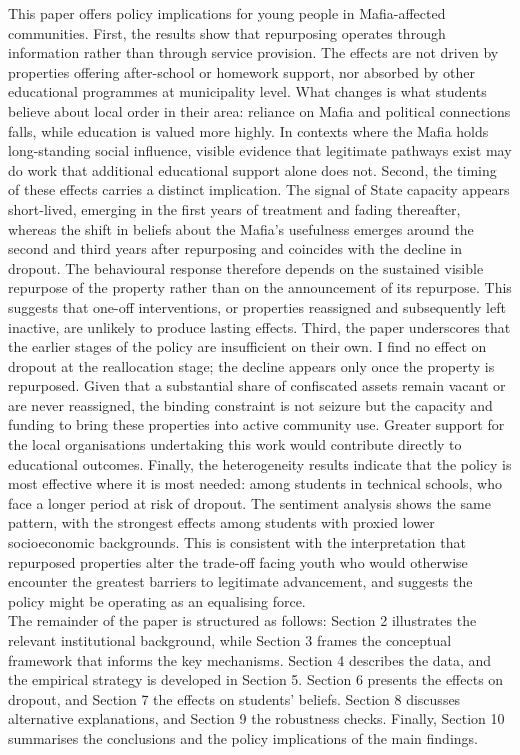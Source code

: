 \documentclass[12pt]{article}
\theoremstyle{plain}
\theoremstyle{plain}
\theoremstyle{plain}
\theoremstyle{definition}
\theoremstyle{plain}
\theoremstyle{definition}
\theoremstyle{plain}
\theoremstyle{remark}
\theoremstyle{definition}
\theoremstyle{definition}
\theoremstyle{plain}
\begin{document}
This paper offers policy implications for young people in Mafia-affected communities. First, the results show that repurposing operates through information rather than through service provision. The effects are not driven by properties offering after-school or homework support, nor absorbed by other educational programmes at municipality level. What changes is what students believe about local order in their area: reliance on Mafia and political connections falls, while education is valued more highly. In contexts where the Mafia holds long-standing social influence, visible evidence that legitimate pathways exist may do work that additional educational support alone does not.
Second, the timing of these effects carries a distinct implication. The signal of State capacity appears short-lived, emerging in the first years of treatment and fading thereafter, whereas the shift in beliefs about the Mafia's usefulness emerges around the second and third years after repurposing and coincides with the decline in dropout. The behavioural response therefore depends on the sustained visible repurpose of the property rather than on the announcement of its repurpose. This suggests that one-off interventions, or properties reassigned and subsequently left inactive, are unlikely to produce lasting effects.
Third, the paper underscores that the earlier stages of the policy are insufficient on their own. I find no effect on dropout at the reallocation stage; the decline appears only once the property is repurposed. Given that a substantial share of confiscated assets remain vacant or are never reassigned, the binding constraint is not seizure but the capacity and funding to bring these properties into active community use. Greater support for the local organisations undertaking this work would contribute directly to educational outcomes.
Finally, the heterogeneity results indicate that the policy is most effective where it is most needed: among students in technical schools, who face a longer period at risk of dropout. The sentiment analysis shows the same pattern, with the strongest effects among students with proxied lower socioeconomic backgrounds. This is consistent with the interpretation that repurposed properties alter the trade-off facing youth who would otherwise encounter the greatest barriers to legitimate advancement, and suggests the policy might be operating as an equalising force. \\

The remainder of the paper is structured as follows: Section 2 illustrates the relevant institutional background, while Section 3 frames the conceptual framework that informs the key mechanisms. Section 4 describes the data, and the empirical strategy is developed in Section 5. Section 6 presents the effects on dropout, and Section 7 the effects on students' beliefs. Section 8 discusses alternative explanations, and Section 9 the robustness checks. Finally, Section 10 summarises the conclusions and the policy implications of the main findings. \par
\end{document}
